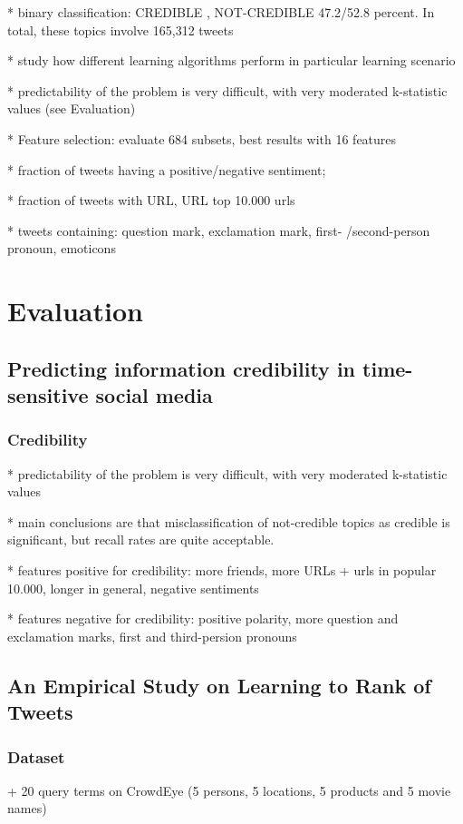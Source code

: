 \documentclass{proseminar}
\begin{document}
* binary classification: CREDIBLE , NOT-CREDIBLE 47.2/52.8 percent. In total, these topics involve 165,312 tweets

* study how different learning algorithms perform in particular learning scenario

* predictability of the problem is very difficult, with very moderated k-statistic values (see Evaluation)

* Feature selection: evaluate 684 subsets, best results with 16 features

* fraction of tweets having a positive/negative sentiment; 

* fraction of tweets with URL, URL top 10.000 urls

* tweets containing: question mark, exclamation mark, first- /second-person pronoun, emoticons


\section{Evaluation}
\subsection{Predicting information credibility in time-sensitive social media}

\subsubsection*{Credibility}
* predictability of the problem is very difficult, with very moderated k-statistic values

* main conclusions are that misclassification of not-credible topics as credible is significant, but recall rates are quite acceptable.

* features positive for credibility: more friends, more URLs + urls in popular 10.000, longer in general, negative sentiments

* features negative for credibility: positive polarity, more question and exclamation marks, first and third-persion pronouns


\subsection{An Empirical Study on Learning to Rank of Tweets}
\subsubsection*{Dataset}
+ 20 query terms on CrowdEye (5 persons, 5 locations, 5 products and 5 movie names)
\end{document}
